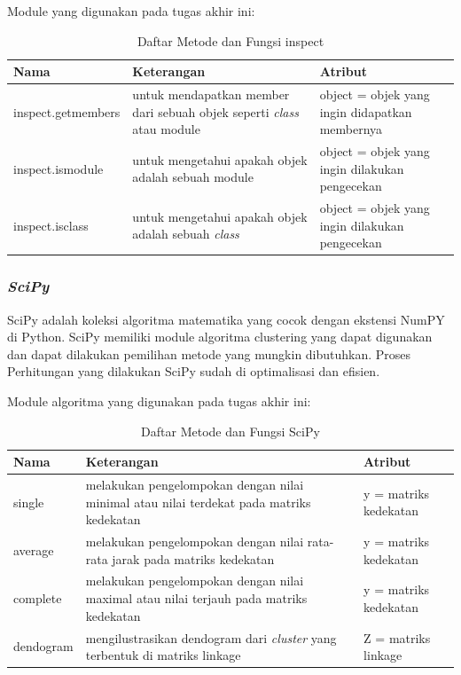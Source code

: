 Module yang digunakan pada tugas akhir ini:
\begingroup
\setlength{\LTleft}{-20cm plus -1fill}
\setlength{\LTright}{\LTleft}
\begin{small}
	\begin{longtable}{|p{3cm}|p{5cm}|p{4.5cm}|}
		\caption{Daftar Metode dan Fungsi inspect}\\
		\hline
		\textbf{Nama} & \textbf{Keterangan} & \textbf{Atribut}\\
		\endfirsthead
		
		\hline
		    inspect.getmembers
		  &  untuk mendapatkan member dari sebuah objek seperti \textit{class} atau module
		  & object = objek yang ingin didapatkan membernya\\
		\hline 
		    inspect.ismodule
		  & untuk mengetahui apakah objek adalah sebuah module
		  & object = objek yang ingin dilakukan pengecekan\\
		\hline  
		\hline
		    inspect.isclass
		  & untuk mengetahui apakah objek adalah sebuah \textit{class}
		  & object = objek yang ingin dilakukan pengecekan\\
		\hline  
	\end{longtable}
\end{small}
\endgroup

\subsubsection{\textit{SciPy} \cite{scipy}}
SciPy adalah koleksi algoritma matematika yang cocok dengan ekstensi NumPY di Python. SciPy memiliki module algoritma clustering yang dapat digunakan dan dapat dilakukan pemilihan metode yang mungkin dibutuhkan. Proses Perhitungan yang dilakukan SciPy sudah di optimalisasi dan efisien.

Module algoritma yang digunakan pada tugas akhir ini:
\begingroup
\setlength{\LTleft}{-20cm plus -1fill}
\setlength{\LTright}{\LTleft}
\begin{small}
	\begin{longtable}{|p{3cm}|p{5cm}|p{4.5cm}|}
		\caption{Daftar Metode dan Fungsi SciPy}\\
		\hline
		\textbf{Nama} & \textbf{Keterangan} & \textbf{Atribut}\\
		\endfirsthead
		
		\hline
		 	single
		  & melakukan pengelompokan dengan nilai minimal atau nilai terdekat pada matriks kedekatan
		  & y = matriks kedekatan \\
		\hline  
		 average
		  & melakukan pengelompokan dengan nilai rata-rata jarak pada matriks kedekatan
		  & y = matriks kedekatan \\
		\hline  
		complete
		  & melakukan pengelompokan dengan nilai maximal atau nilai terjauh pada matriks kedekatan
		  & y = matriks kedekatan \\
		  \hline  
		dendogram
		  & mengilustrasikan dendogram dari \textit{cluster} yang terbentuk di matriks linkage
		  & Z = matriks linkage  \\
		\hline  
	\end{longtable}
\end{small}
\endgroup


